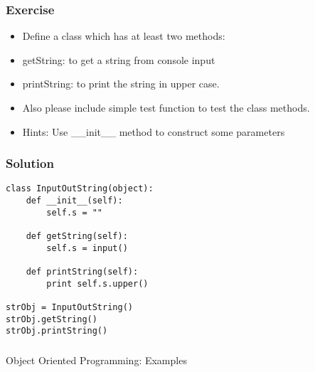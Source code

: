 \begin{frame}[fragile]\frametitle{Exercise}
\begin{itemize}
\item Define a class which has at least two methods:
\item getString: to get a string from console input
\item printString: to print the string in upper case.
\item Also please include simple test function to test the class methods.
\item Hints: Use \_\_init\_\_ method to construct some parameters
\end{itemize}
\end{frame}

\begin{frame}[fragile]\frametitle{Solution}
\begin{lstlisting}
class InputOutString(object):
    def __init__(self):
        self.s = ""

    def getString(self):
        self.s = input()

    def printString(self):
        print self.s.upper()

strObj = InputOutString()
strObj.getString()
strObj.printString()
\end{lstlisting}
\end{frame}

\begin{frame}[fragile]\frametitle{}
\begin{center}
{\Large Object Oriented Programming: Examples}
\end{center}
\end{frame}



